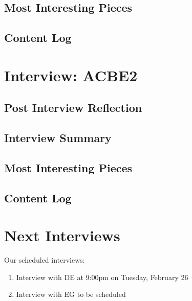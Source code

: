 \documentclass{article}
\begin{document}
\subsection{Most Interesting Pieces}
\subsection{Content Log}
\section{Interview: ACBE2}
\subsection{Post Interview Reflection}
\subsection{Interview Summary}
\subsection{Most Interesting Pieces}
\subsection{Content Log}
\section{Next Interviews}
Our scheduled interviews:
\begin{enumerate}
  \item Interview with DE at 9:00pm on Tuesday, February 26
  \item Interview with EG to be scheduled
\end{enumerate}
\end{document}
